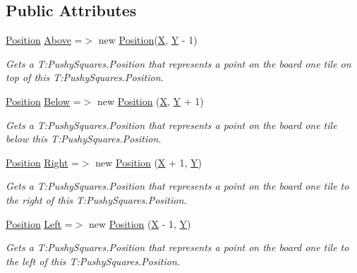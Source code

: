 \subsection*{Public Attributes}
\begin{DoxyCompactItemize}
\item 
\hyperlink{struct_pushy_squares_1_1_position}{Position} \hyperlink{struct_pushy_squares_1_1_position_a02a1050a7cfc56b9b52eb1a63a9d72aa}{Above} =$>$ new \hyperlink{struct_pushy_squares_1_1_position}{Position}(\hyperlink{struct_pushy_squares_1_1_position_a35115084c01a6abc427fcebe771d6a87}{X}, \hyperlink{struct_pushy_squares_1_1_position_a976a349430fe3bdf57db6eb77f9b0b84}{Y} -\/ 1)
\begin{DoxyCompactList}\small\item\em Gets a T\+:\+Pushy\+Squares.\+Position that represents a point on the board one tile on top of this T\+:\+Pushy\+Squares.\+Position. \end{DoxyCompactList}\item 
\hyperlink{struct_pushy_squares_1_1_position}{Position} \hyperlink{struct_pushy_squares_1_1_position_a6a6a8513eda2a0eec5e1b8a514b905db}{Below} =$>$ new \hyperlink{struct_pushy_squares_1_1_position}{Position} (\hyperlink{struct_pushy_squares_1_1_position_a35115084c01a6abc427fcebe771d6a87}{X}, \hyperlink{struct_pushy_squares_1_1_position_a976a349430fe3bdf57db6eb77f9b0b84}{Y} + 1)
\begin{DoxyCompactList}\small\item\em Gets a T\+:\+Pushy\+Squares.\+Position that represents a point on the board one tile below this T\+:\+Pushy\+Squares.\+Position. \end{DoxyCompactList}\item 
\hyperlink{struct_pushy_squares_1_1_position}{Position} \hyperlink{struct_pushy_squares_1_1_position_a76b2cd7dc03027afe757ea4f81336bba}{Right} =$>$ new \hyperlink{struct_pushy_squares_1_1_position}{Position} (\hyperlink{struct_pushy_squares_1_1_position_a35115084c01a6abc427fcebe771d6a87}{X} + 1, \hyperlink{struct_pushy_squares_1_1_position_a976a349430fe3bdf57db6eb77f9b0b84}{Y})
\begin{DoxyCompactList}\small\item\em Gets a T\+:\+Pushy\+Squares.\+Position that represents a point on the board one tile to the right of this T\+:\+Pushy\+Squares.\+Position. \end{DoxyCompactList}\item 
\hyperlink{struct_pushy_squares_1_1_position}{Position} \hyperlink{struct_pushy_squares_1_1_position_a9918a40006026cdf9ff27f8e27932400}{Left} =$>$ new \hyperlink{struct_pushy_squares_1_1_position}{Position} (\hyperlink{struct_pushy_squares_1_1_position_a35115084c01a6abc427fcebe771d6a87}{X} -\/ 1, \hyperlink{struct_pushy_squares_1_1_position_a976a349430fe3bdf57db6eb77f9b0b84}{Y})
\begin{DoxyCompactList}\small\item\em Gets a T\+:\+Pushy\+Squares.\+Position that represents a point on the board one tile to the left of this T\+:\+Pushy\+Squares.\+Position. \end{DoxyCompactList}\end{DoxyCompactItemize}

